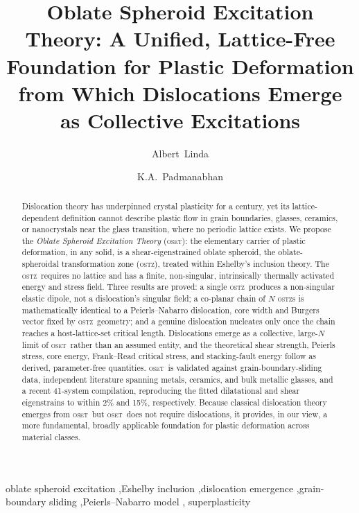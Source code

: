 \documentclass[3p]{elsarticle}
\newcommand{\OSTZ}{\textsc{ostz}}
\newcommand{\OSET}{\textsc{oset}}
\begin{document}
\begin{frontmatter}

\title{Oblate Spheroid Excitation Theory: A Unified,
  Lattice-Free Foundation for Plastic Deformation from Which
  Dislocations Emerge as Collective Excitations}

\author[iitk]{Albert~Linda}
\author[anna]{K.A.~Padmanabhan}


\begin{abstract}
Dislocation theory has underpinned crystal plasticity for a
century, yet its lattice-dependent definition cannot describe plastic
flow in grain boundaries, glasses, ceramics, or nanocrystals near the
glass transition, where no periodic lattice exists. We propose the
\emph{Oblate Spheroid Excitation Theory} (\OSET): the elementary
carrier of plastic deformation, in any solid, is a shear-eigenstrained
oblate spheroid, the oblate-spheroidal transformation zone (\OSTZ),
treated within Eshelby's inclusion theory. The \OSTZ\ requires
no lattice and has a finite, non-singular, intrinsically thermally
activated energy and stress field. Three results are proved: a
single \OSTZ\ produces a non-singular elastic dipole, not a
dislocation's singular field; a co-planar chain of $N$ \OSTZ s is
mathematically identical to a Peierls--Nabarro dislocation, core
width and Burgers vector fixed by \OSTZ\ geometry; and a genuine
dislocation nucleates only once the chain reaches a host-lattice-set
critical length. Dislocations emerge as a collective,
large-$N$ limit of \OSET\ rather than an assumed entity,
and the theoretical shear strength, Peierls stress, core energy,
Frank--Read critical stress, and stacking-fault energy follow as
derived, parameter-free quantities. \OSET\ is validated against
grain-boundary-sliding data, independent literature spanning metals,
ceramics, and bulk metallic glasses, and a recent 41-system compilation,
reproducing the fitted dilatational and shear eigenstrains to within
2\% and 15\%, respectively. Because classical dislocation
theory emerges from \OSET\ but \OSET\ does not require dislocations,
it provides, in our view, a more fundamental, broadly applicable
foundation for plastic deformation across material classes.
\end{abstract}

\begin{keyword}
oblate spheroid excitation \sep Eshelby inclusion \sep dislocation
emergence \sep grain-boundary sliding \sep Peierls--Nabarro model \sep
superplasticity
\end{keyword}
\end{frontmatter}
\end{document}
